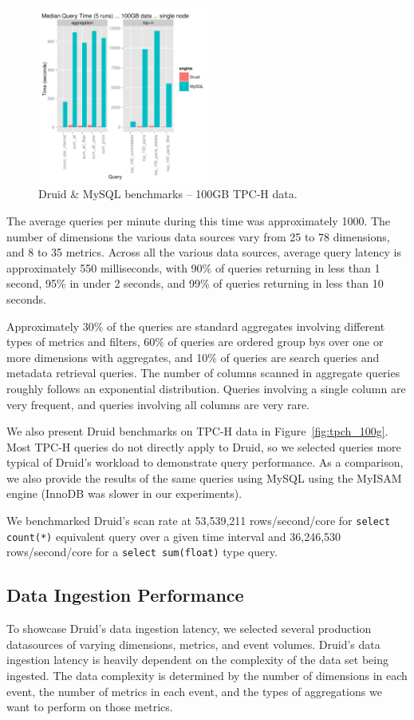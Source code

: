 \documentclass{vldb}
\begin{document}
\begin{figure}
\centering
\includegraphics[width = 2.3in]{tpch_100gb}
\caption{Druid \& MySQL benchmarks -- 100GB TPC-H data.}
\label{fig:tpch_100gb}
\end{figure}

The average queries per minute during this time was approximately
1000. The number of dimensions the various data sources vary from 25 to 78
dimensions, and 8 to 35 metrics. Across all the various data sources, average
query latency is approximately 550 milliseconds, with 90\% of queries returning
in less than 1 second, 95\% in under 2 seconds, and 99\% of queries returning
in less than 10 seconds.  

Approximately 30\% of the queries are standard
aggregates involving different types of metrics and filters, 60\% of queries
are ordered group bys over one or more dimensions with aggregates, and 10\% of
queries are search queries and metadata retrieval queries. The number of
columns scanned in aggregate queries roughly follows an exponential
distribution. Queries involving a single column are very frequent, and queries
involving all columns are very rare.

We also present Druid benchmarks on TPC-H data in Figure~\ref{fig:tpch_100g}.
Most TPC-H queries do not directly apply to Druid, so we selected queries more
typical of Druid's workload to demonstrate query performance. As a comparison,
we also provide the results of the same queries using MySQL using the MyISAM
engine (InnoDB was slower in our experiments).

We benchmarked Druid's scan rate at 53,539,211 rows/second/core for
\texttt{select count(*)} equivalent query over a given time interval and
36,246,530 rows/second/core for a \texttt{select sum(float)} type query.

\subsection{Data Ingestion Performance}
To showcase Druid's data ingestion latency, we selected several production
datasources of varying dimensions, metrics, and event volumes. Druid's data
ingestion latency is heavily dependent on the complexity of the data set being
ingested. The data complexity is determined by the number of dimensions in each
event, the number of metrics in each event, and the types of aggregations we
want to perform on those metrics. 
\end{document}
